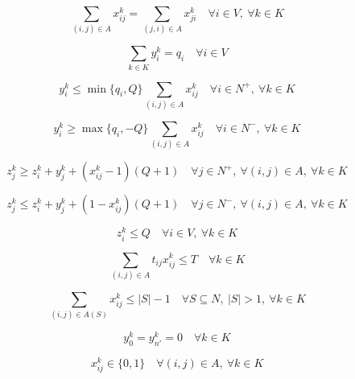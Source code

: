 \documentclass{article}
\begin{document}
\begin{equation}
\sum_{(i,j) \in A} x_{ij}^{k} = \sum_{(j,i) \in A} x_{ji}^{k}
\quad \forall i \in V,\ \forall k \in K
\tag{EC.2c}
\end{equation}

\begin{equation}
\sum_{k \in K} y_i^k = q_i
\quad \forall i \in V
\tag{EC.2d}
\end{equation}

\begin{equation}
y_i^k \le \min\{q_i,Q\} \sum_{(i,j) \in A} x_{ij}^{k}
\quad \forall i \in N^{+},\ \forall k \in K
\tag{EC.2e}
\end{equation}

\begin{equation}
y_i^k \ge \max\{q_i,-Q\} \sum_{(i,j) \in A} x_{ij}^{k}
\quad \forall i \in N^{-},\ \forall k \in K
\tag{EC.2f}
\end{equation}

\begin{equation}
z_j^k \ge z_i^k + y_j^k + (x_{ij}^{k} - 1)(Q+1)
\quad \forall j \in N^{+},\ \forall (i,j) \in A,\ \forall k \in K
\tag{EC.2g}
\end{equation}

\begin{equation}
z_j^k \le z_i^k + y_j^k + (1 - x_{ij}^{k})(Q+1)
\quad \forall j \in N^{-},\ \forall (i,j) \in A,\ \forall k \in K
\tag{EC.2h}
\end{equation}

\begin{equation}
z_i^k \le Q
\quad \forall i \in V,\ \forall k \in K
\tag{EC.2i}
\end{equation}

\begin{equation}
\sum_{(i,j) \in A} t_{ij} x_{ij}^{k} \le T
\quad \forall k \in K
\tag{EC.2j}
\end{equation}

\begin{equation}
\sum_{(i,j) \in A(S)} x_{ij}^{k} \le |S| - 1
\quad \forall S \subseteq N,\ |S| > 1,\ \forall k \in K
\tag{EC.2k}
\end{equation}

\begin{equation}
y_0^k = y_{n'}^k = 0
\quad \forall k \in K
\tag{EC.2l}
\end{equation}

\begin{equation}
x_{ij}^{k} \in \{0,1\}
\quad \forall (i,j) \in A,\ \forall k \in K
\tag{EC.2m}
\end{equation}
\end{document}
